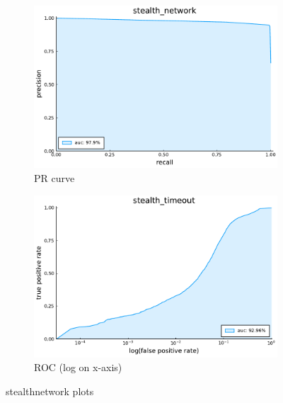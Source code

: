 \begin{figure}
    \centering
    \begin{subfigure}{.49\textwidth}
      \centering
      \includegraphics[width=1\linewidth]{pdfs/modperf/stealth_network.bson-pr.pdf}
      \caption{PR curve}
    \end{subfigure}
    \begin{subfigure}{.49\textwidth}
        \centering
        \includegraphics[width=1\linewidth]{pdfs/modperf/stealth_timeout.bson-roclog.pdf}
        \caption{ROC (log on x-axis)}
    \end{subfigure}
    \caption{stealthnetwork plots}
    \label{fig:fig}
\end{figure}





